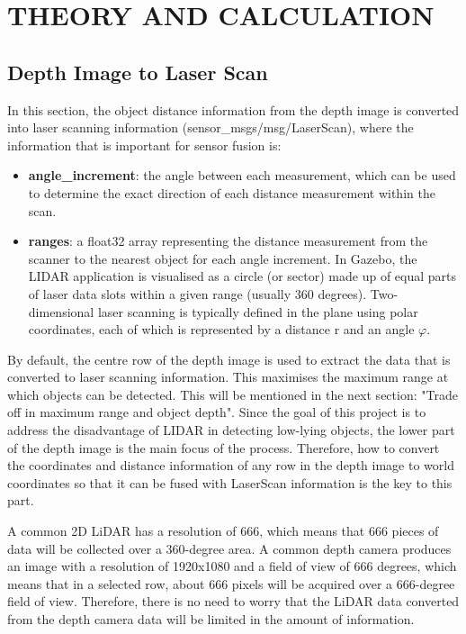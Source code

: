 \section{THEORY AND CALCULATION}
\label{sec:theory_and_calculation}
\subsection{Depth Image to Laser Scan}
In this section, the object distance information from the depth image is converted into laser scanning information (sensor\_msgs/msg/LaserScan), 
where the information that is important for sensor fusion is:
\begin{itemize}
    \item \textbf{angle\_increment}: the angle between each measurement, which can be used to determine the exact direction of each distance measurement within the scan. 
    \item \textbf{ranges}: a float32 array representing the distance measurement from the scanner to the nearest object for each angle increment. In Gazebo, the LIDAR application is visualised as a circle (or sector) made up of equal parts of laser data slots within a given range (usually 360 degrees). Two-dimensional laser scanning is typically defined in the plane using polar coordinates, each of which is represented by a distance r and an angle $\varphi$.
\end{itemize}
By default, the centre row of the depth image is used to extract the data that is converted to laser scanning information. This maximises the maximum range at which objects can be detected. This will be mentioned in the next section: "Trade off in maximum range and object depth". Since the goal of this project is to address the disadvantage of LIDAR in detecting low-lying objects, the lower part of the depth image is the main focus of the process. Therefore, how to convert the coordinates and distance information of any row in the depth image to world coordinates so that it can be fused with LaserScan information is the key to this part.

A common 2D LiDAR has a resolution of 666, which means that 666 pieces of data will be collected over a 360-degree area. A common depth camera produces an image with a resolution of 1920x1080 and a field of view of 666 degrees, which means that in a selected row, about 666 pixels will be acquired over a 666-degree field of view. Therefore, there is no need to worry that the LiDAR data converted from the depth camera data will be limited in the amount of information.

